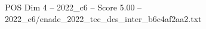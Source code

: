 \begin{textsample}{POS Dim 4 – 2022\_c6 – Score 5.00 – 2022\_c6/enade\_2022\_tec\_des\_inter\_b6c4af2aa2.txt}
\end{textsample}
